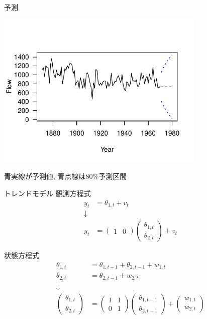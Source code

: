 \documentclass[dvipdfmx,12pt]{beamer}
\begin{document}
\begin{frame}{予測}

\begin{center}
\includegraphics[width=10cm]{dlm1_predict}
\end{center}

青実線が予測値, 青点線は80\%予測区間
\end{frame}



\begin{frame}{トレンドモデル}
  観測方程式
  \begin{align*}
    y_{t} &= \theta_{1,t} + v_{t} \\
    \downarrow \\
    y_{t} &= \left(\begin{array}{cc}1 & 0\end{array}\right)
      \left(\begin{array}{c}\theta_{1,t} \\ \theta_{2,t} \end{array}\right) + v_{t} 
  \end{align*}

  状態方程式
  \begin{align*}
    \theta_{1,t} &= \theta_{1,t-1} + \theta_{2,t-1} + w_{1,t} \\
    \theta_{2,t} &= \theta_{2,t-1} + w_{2,t} \\
    \downarrow \\
    \left(\begin{array}{c}\theta_{1,t} \\ \theta_{2,t}\end{array}\right) &=
    \left(\begin{array}{cc}1 & 1 \\ 0 & 1 \end{array}\right)
    \left(\begin{array}{c}\theta_{1,t-1} \\ \theta_{2,t-1}\end{array}\right) +
    \left(\begin{array}{c}w_{1,t} \\ w_{2,t}\end{array}\right)
  \end{align*}

\end{frame}
\end{document}
